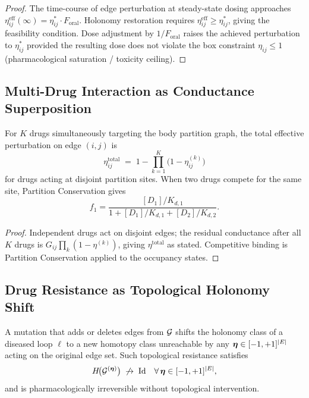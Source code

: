 \begin{proof}
The time-course of edge perturbation at steady-state dosing approaches
$\eta_{ij}^{\mathrm{eff}}(\infty) = \eta_{ij}^*\cdot F_{\mathrm{oral}}$.
Holonomy restoration requires $\eta_{ij}^{\mathrm{eff}} \geq \eta_{ij}^*$,
giving the feasibility condition.  Dose adjustment by $1/F_{\mathrm{oral}}$
raises the achieved perturbation to $\eta_{ij}^*$ provided the resulting dose
does not violate the box constraint $\eta_{ij} \leq 1$ (pharmacological
saturation / toxicity ceiling).
\end{proof}

\subsection{Multi-Drug Interaction as Conductance Superposition}
\label{subsec:ch09-multidrug}

\begin{proposition}
\label{prop:ch09-multidrug}
For $K$ drugs simultaneously targeting the body partition graph, the total
effective perturbation on edge $(i,j)$ is
\begin{equation}
  \eta_{ij}^{\mathrm{total}}
  \;=\; 1 - \prod_{k=1}^{K}\bigl(1 - \eta_{ij}^{(k)}\bigr)
  \label{eq:ch09-superposition}
\end{equation}
for drugs acting at disjoint partition sites.  When two drugs compete for the
same site, Partition Conservation gives
\begin{equation}
  f_1 = \frac{[D_1]/K_{d,1}}{1 + [D_1]/K_{d,1} + [D_2]/K_{d,2}}.
  \label{eq:ch09-competition}
\end{equation}
\end{proposition}

\begin{proof}
Independent drugs act on disjoint edges; the residual conductance after all $K$
drugs is $G_{ij}\prod_k(1-\eta^{(k)})$, giving $\eta^{\mathrm{total}}$ as
stated.  Competitive binding is Partition Conservation applied to the occupancy
states.
\end{proof}

\subsection{Drug Resistance as Topological Holonomy Shift}
\label{subsec:ch09-resistance}

\begin{proposition}
\label{prop:ch09-resistance}
A mutation that adds or deletes edges from $\mathcal{G}$ shifts the holonomy class
of a diseased loop $\ell$ to a new homotopy class unreachable by any
$\boldsymbol{\eta} \in [-1,+1]^{|E|}$ acting on the original edge set.  Such
topological resistance satisfies
\begin{equation}
  H\!\bigl(\mathcal{G}^{(\boldsymbol{\eta})}\bigr) \;\not\to\; \mathrm{Id}
  \quad\forall\, \boldsymbol{\eta} \in [-1,+1]^{|E|},
  \label{eq:ch09-resistance}
\end{equation}
and is pharmacologically irreversible without topological intervention.
\end{proposition}

